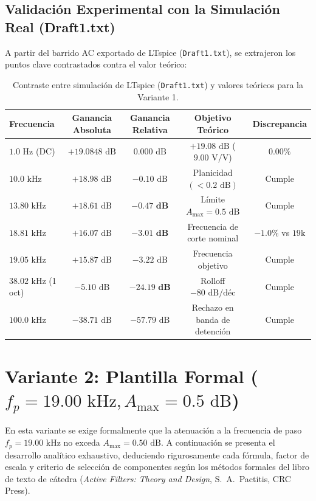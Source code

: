 \documentclass[a4paper,11pt]{article}
\begin{document}
\subsection{Validación Experimental con la Simulación Real (Draft1.txt)}
A partir del barrido AC exportado de LTspice (\texttt{Draft1.txt}), se extrajeron los puntos clave contrastados contra el valor teórico:
\begin{table}[H]
\centering
\begin{tabular}{lcccc}
\toprule
\textbf{Frecuencia} & \textbf{Ganancia Absoluta} & \textbf{Ganancia Relativa} & \textbf{Objetivo Teórico} & \textbf{Discrepancia} \\
\midrule
$1.0\text{ Hz}$ (DC) & $+19.0848\text{ dB}$ & $0.000\text{ dB}$ & $+19.08\text{ dB}$ ($9.00\text{ V/V}$) & $0.00\%$ \\
$10.0\text{ kHz}$ & $+18.98\text{ dB}$ & $-0.10\text{ dB}$ & Planicidad $(<0.2\text{ dB})$ & Cumple \\
$13.80\text{ kHz}$ & $+18.61\text{ dB}$ & $\mathbf{-0.47\text{ dB}}$ & Límite $A_{\max} = 0.5\text{ dB}$ & Cumple \\
$18.81\text{ kHz}$ & $+16.07\text{ dB}$ & $\mathbf{-3.01\text{ dB}}$ & Frecuencia de corte nominal & $-1.0\%$ vs $19\text{k}$ \\
$19.05\text{ kHz}$ & $+15.87\text{ dB}$ & $-3.22\text{ dB}$ & Frecuencia objetivo & Cumple \\
$38.02\text{ kHz}$ (1 oct) & $-5.10\text{ dB}$ & $\mathbf{-24.19\text{ dB}}$ & Rolloff $-80\text{ dB/déc}$ & Cumple \\
$100.0\text{ kHz}$ & $-38.71\text{ dB}$ & $-57.79\text{ dB}$ & Rechazo en banda de detención & Cumple \\
\bottomrule
\end{tabular}
\caption{Contraste entre simulación de LTspice (\texttt{Draft1.txt}) y valores teóricos para la Variante 1.}
\label{tab:val_draft1}
\end{table}

\section{Variante 2: Plantilla Formal \texorpdfstring{($f_p = 19.00\text{ kHz}, A_{\max} = 0.5\text{ dB}$)}{(fp = 19 kHz, Amax = 0.5 dB)}}

En esta variante se exige formalmente que la atenuación a la frecuencia de paso $f_p = 19.00\text{ kHz}$ no exceda $A_{\max} = 0.50\text{ dB}$. A continuación se presenta el desarrollo analítico exhaustivo, deduciendo rigurosamente cada fórmula, factor de escala y criterio de selección de componentes según los métodos formales del libro de texto de cátedra (\textit{Active Filters: Theory and Design}, S.~A.~Pactitis, CRC Press).
\end{document}
